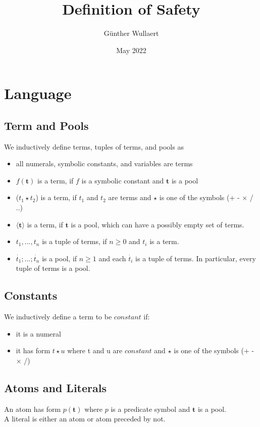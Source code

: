 \documentclass{article}
\title{Definition of Safety}
\author{Günther Wullaert}
\date{May 2022}
\newcommand{\pool}[1]{\boldsymbol{#1}}
\newcommand{\tuple}[1]{\dot{#1}}
\begin{document}
	\maketitle
	
	\section{Language}
	\subsection{Term and Pools}
	
	We inductively define terms, tuples of terms, and pools as
	\begin{itemize}
		\item all numerals, symbolic constants, and variables are terms 
		\item $f(\pool{t})$ is a term, if $f$ is a symbolic constant and $\pool{t}$ is a pool
		\item ($t_1 \star t_2$) is a term, if $t_1$ and $t_2$ are terms and $\star$ is one of the symbols (+ - × / ..)
		\item $\langle \pool{t} \rangle$ is a term, if $\pool{t}$ is a pool, which can have a possibly empty set of terms.
		\item $t_1,...,t_n$ is a tuple of terms, if $n \ge 0$ and $t_i$ is a term.
  		\item $\tuple{t_1};...;\tuple{t_n}$ is a pool, if $n \ge 1$ and each $\tuple{t_i}$ is a tuple of terms. In particular, every tuple of terms is a pool.
	\end{itemize}

	\subsection{Constants}

	We inductively define a term to be $\mathit{constant}$ if:
	\begin{itemize}
		\item it is a numeral
		\item it has form $t \star u$ where t and u are $\mathit{constant}$ and $\star$ is one of the symbols (+ - × /)
	\end{itemize}

	\subsection{Atoms and Literals}
	
	An atom has form $p(\pool{t})$ where $p$ is a predicate symbol and $\pool{t}$ is a pool. 
	\\
	A literal is either an atom or atom preceded by not.
\end{document}
